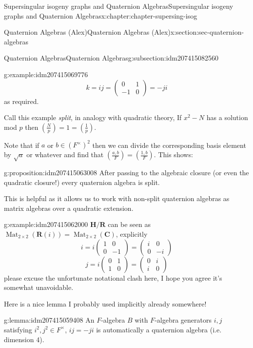 \documentclass[oneside,10pt,]{book}
\numberwithin{equation}{section}
\newcommand{\legendre}[2]{\left(\frac{#1}{#2}\right)}
\newcommand{\RR}{\mathbf{R}}
\newcommand{\CC}{\mathbf{C}}
\newcommand{\HH}{\mathbf{H}}
\DeclareMathOperator{\Mat}{Mat}
\newcommand{\amp}{&}
\begin{document}
\begin{chapterptx}{Supersingular isogeny graphs and Quaternion Algebras}{}{Supersingular isogeny graphs and Quaternion Algebras}{}{}{x:chapter:chapter-supersing-isog}
\begin{sectionptx}{Quaternion Algebras (Alex)}{}{Quaternion Algebras (Alex)}{}{}{x:section:sec-quaternion-algebras}
\begin{subsectionptx}{Quaternion Algebras}{}{Quaternion Algebras}{}{}{g:subsection:idm207415082560}
\begin{introduction}{}
\begin{example}{}{g:example:idm207415069776}
\begin{equation*}
k = ij = \begin{pmatrix} 0\amp1\\-1\amp 0\end{pmatrix} = -ji
\end{equation*}
as required.%
\end{example}
Call this example \emph{split}, in analogy with quadratic theory,  If \(x^2 - N\) has a solution mod \(p\) then \(\legendre{N}{p} = 1 = \legendre{1}{p}\).%
\par
Note that if \(a\) or \(b \in (F^\times)^2\) then we can divide the corresponding basis element by \(\sqrt{a}\) or whatever and find that \(\legendre{a,b}{F} = \legendre{1,b}{F}\). This shows:%
\begin{proposition}{}{}{g:proposition:idm207415063008}%
After passing to the algebraic closure (or even the quadratic closure!) every quaternion algebra is split.%
\end{proposition}
This is helpful as it allows us to work with non-split quaternion algebras as matrix algebras over a quadratic extension.%
\begin{example}{}{g:example:idm207415062000}%
\(\HH/\RR\) can be seen as \(\Mat_{2\times 2}(\RR(i)) = \Mat_{2\times 2}(\CC)\), explicitly%
\begin{equation*}
i=  i\begin{pmatrix} 1\amp0\\0\amp -1\end{pmatrix} = \begin{pmatrix} i\amp0\\0\amp -i\end{pmatrix}
\end{equation*}
%
\begin{equation*}
j = i\begin{pmatrix} 0\amp1\\1\amp 0\end{pmatrix} = \begin{pmatrix} 0\amp i\\i\amp 0\end{pmatrix}
\end{equation*}
please excuse the unfortunate notational clash here, I hope you agree it's somewhat unavoidable.%
\end{example}
Here is a nice lemma I probably used implicitly already somewhere!%
\begin{lemma}{}{}{g:lemma:idm207415059408}%
An \(F\)-algebra \(B\) with \(F\)-algebra generators \(i,j\) satisfying \(i^2,j^2\in F^\times\), \(ij = -ji\) is automatically a quaternion algebra (i.e. dimension 4).%

\end{lemma}
\end{introduction}
\end{subsectionptx}
\end{sectionptx}
\end{chapterptx}
\end{document}
